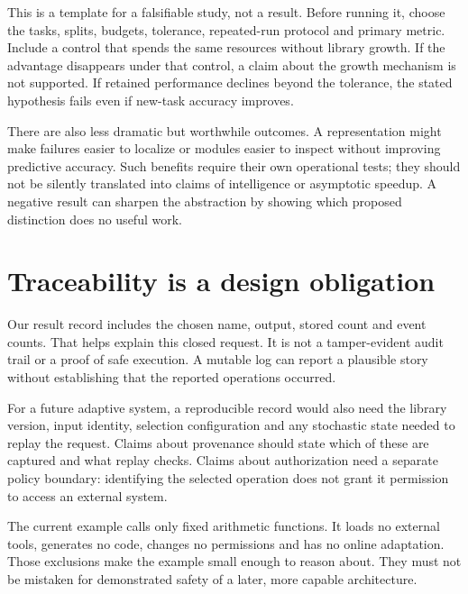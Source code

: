This is a template for a falsifiable study, not a result. Before running it,
choose the tasks, splits, budgets, tolerance, repeated-run protocol and primary
metric. Include a control that spends the same resources without library
growth. If the advantage disappears under that control, a claim about the
growth mechanism is not supported. If retained performance declines beyond
the tolerance, the stated hypothesis fails even if new-task accuracy improves.

There are also less dramatic but worthwhile outcomes. A representation might
make failures easier to localize or modules easier to inspect without improving
predictive accuracy. Such benefits require their own operational tests; they
should not be silently translated into claims of intelligence or asymptotic
speedup. A negative result can sharpen the abstraction by showing which
proposed distinction does no useful work.

\section{Traceability is a design obligation}
Our result record includes the chosen name, output, stored count and event
counts. That helps explain this closed request. It is not a tamper-evident
audit trail or a proof of safe execution. A mutable log can report a plausible
story without establishing that the reported operations occurred.

For a future adaptive system, a reproducible record would also need the library
version, input identity, selection configuration and any stochastic state
needed to replay the request. Claims about \gls{provenance} should state which
of these are captured and what replay checks. Claims about authorization need
a separate policy boundary: identifying the selected operation does not grant
it permission to access an external system.

The current example calls only fixed arithmetic functions. It loads no external
tools, generates no code, changes no permissions and has no online adaptation.
Those exclusions make the example small enough to reason about. They must not
be mistaken for demonstrated safety of a later, more capable architecture.

